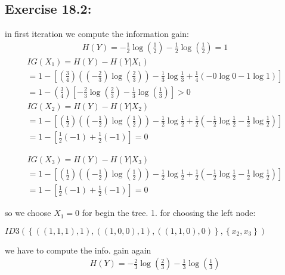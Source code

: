 \documentclass[]{book}
\begin{document}
\subsection*{Exercise 18.2:}

















in first iteration we compute the information gain:
\begin{align*}
    H(Y)=-\frac{1}{2} \log(\frac{1}{2})- \frac{1}{2} \log(\frac{1}{2})=1
\end{align*}
\begin{gather*}
    IG(X_{1})=H(Y)-H(Y|X_{1}) \\
    = 1-\left [ \left ( \frac{3}{4} \right ) \left ( \left ( -\frac{2}{3} \right )\log\left ( \frac{2}{3} \right ) \right )- \frac{1}{3} \log\frac{1}{3} + \frac{1}{4}\left ( -0\log0 -1\log1 \right )\right ] \\= 1-\left ( \frac{3}{4} \right )\left [ -\frac{2}{3}\log\left ( \frac{2}{3} \right )-\frac{1}{3}\log\left ( \frac{1}{3} \right ) \right ]> 0
\end{gather*}
\begin{gather*}
    IG(X_{2})=H(Y)-H(Y|X_{2})\\
    = 1-\left [ \left ( \frac{1}{2} \right ) \left ( \left ( -\frac{1}{2} \right )\log\left ( \frac{1}{2} \right ) \right )- \frac{1}{2} \log\frac{1}{2} + \frac{1}{2}\left ( -\frac{1}{2}\log\frac{1}{2} -\frac{1}{2}\log\frac{1}{2} \right )\right ] \\
    = 1-\left[\frac{1}{2}(-1) + \frac{1}{2}(-1)\right ]=0
\end{gather*}

\begin{gather*}
    IG(X_{3})=H(Y)-H(Y|X_{3})\\
    = 1-\left [ \left ( \frac{1}{2} \right ) \left ( \left ( -\frac{1}{2} \right )\log\left ( \frac{1}{2} \right ) \right )- \frac{1}{2} \log\frac{1}{2} + \frac{1}{2}\left ( -\frac{1}{2}\log\frac{1}{2} -\frac{1}{2}\log\frac{1}{2} \right )\right ] \\
    = 1-\left[\frac{1}{2}(-1) + \frac{1}{2}(-1)\right ]=0
\end{gather*}

so we choose $X_{1}=0$ for begin the tree.
1. for choosing the left node:
\begin{center}
    $ID3\left ( \left\{ \left ( \left ( 1,1,1 \right ) ,1\right ), \left ( \left ( 1,0,0 \right ),1 \right ), \left ( \left ( 1,1,0 \right ),0 \right )\right\},\left\{ x_{2}, x_{3}\right\} \right )$
\end{center}
we have to compute the info. gain again
\begin{align*}
    H(Y)=-\frac{2}{3} \log(\frac{2}{3})- \frac{1}{3} \log(\frac{1}{3})
\end{align*}
\end{document}
